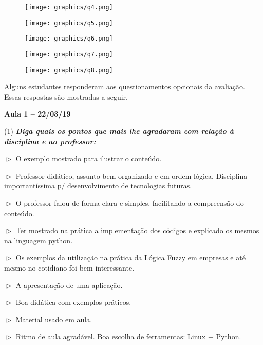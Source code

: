 \documentclass[
	12pt,				%
	openright,			%
	oneside,			%
	a4paper,			%
	chapter=TITLE,		%
	section=TITLE,		%
	english,			%
	french,				%
	spanish,			%
	brazil				%
	]{abntex2}
\begin{document}
\begin{figure}
	\centering
	\texttt{[image: graphics/q4.png]}
\end{figure}

\begin{figure}
	\centering
	\texttt{[image: graphics/q5.png]}
\end{figure}

\begin{figure}
	\centering
	\texttt{[image: graphics/q6.png]}
\end{figure}

\begin{figure}
	\centering
	\texttt{[image: graphics/q7.png]}
\end{figure}

\begin{figure}
	\centering
	\texttt{[image: graphics/q8.png]}
\end{figure}

Alguns estudantes responderam aos questionamentos opcionais da avaliação. Essas respostas são mostradas a seguir.

\textbf{Aula 1 -- 22/03/19}

(1) \textit{\textbf{Diga quais os pontos que mais lhe agradaram com relação à disciplina e ao professor:}}

$\vartriangleright$ O exemplo mostrado para ilustrar o conteúdo.

$\vartriangleright$ Professor didático, assunto bem organizado e em ordem lógica. Disciplina importantíssima p/ desenvolvimento de tecnologias futuras.

$\vartriangleright$ O professor falou de forma clara e simples, facilitando a compreensão do conteúdo.

$\vartriangleright$ Ter mostrado na prática a implementação dos códigos e explicado os mesmos na linguagem python.

$\vartriangleright$ Os exemplos da utilização na prática da Lógica Fuzzy em empresas e até mesmo no cotidiano foi bem interessante.

$\vartriangleright$ A apresentação de uma aplicação.

$\vartriangleright$ Boa didática com exemplos práticos.

$\vartriangleright$ Material usado em aula.

$\vartriangleright$ Ritmo de aula agradável. Boa escolha de ferramentas: Linux + Python.
\end{document}
